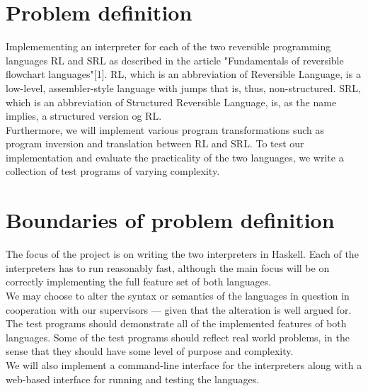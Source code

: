 \section{Problem definition}
\label{sec:problem_definition}
Implemementing an interpreter for each of the two reversible programming languages RL and SRL as described in the article "Fundamentals of reversible flowchart languages"[1]. RL, which is an abbreviation of Reversible Language, is a low-level, assembler-style language with jumps that is, thus, non-structured. SRL, which is an abbreviation of Structured Reversible Language, is, as the name implies, a structured version og RL. \\
\indent Furthermore, we will implement various program transformations such as program inversion and translation between RL and SRL. %
To test our implementation and evaluate the practicality of the two languages, we write a collection of test programs of varying complexity.

\section{Boundaries of problem definition}
\label{sec:boundaries_of_problem_definition}

The focus of the project is on writing the two interpreters in Haskell. Each of the interpreters has to run reasonably fast, although the main focus will be on correctly implementing the full feature set of both languages. \\
\indent We may choose to alter the syntax or semantics of the languages in question in cooperation with our supervisors --- given that the alteration is well argued for. \\
\indent The test programs should demonstrate all of the implemented features of both languages. Some of the test programs should reflect real world problems, in the sense that they should have some level of purpose and complexity. \\
\indent We will also implement a command-line interface for the interpreters along with a web-based interface for running and testing the languages.

